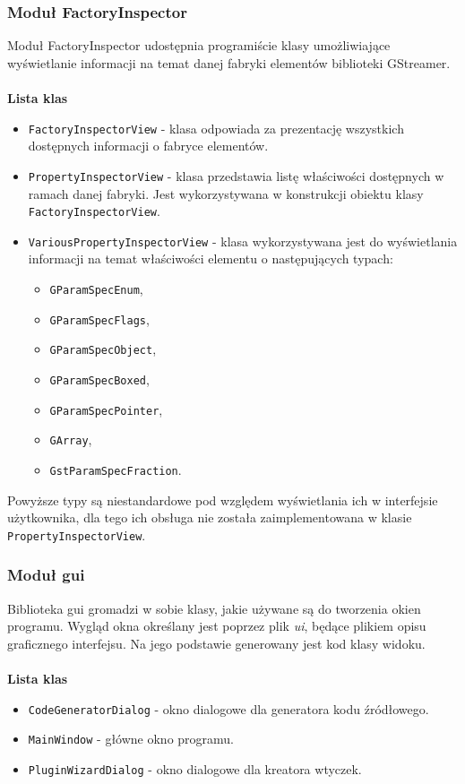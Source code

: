 \documentclass[12pt]{article}
\begin{document}
\subsubsection{Moduł FactoryInspector}
Moduł FactoryInspector udostępnia programiście klasy umożliwiające wyświetlanie informacji na temat danej fabryki elementów biblioteki GStreamer. 
\paragraph{}
\textbf{Lista klas}
\vspace{-2mm}
\begin{itemize}
  \setlength{\itemsep}{0em}
\item \texttt{FactoryInspectorView} - klasa odpowiada za prezentację wszystkich dostępnych informacji o fabryce elementów. 
\item \texttt{PropertyInspectorView} - klasa przedstawia listę właściwości dostępnych w ramach danej fabryki. Jest wykorzystywana w konstrukcji obiektu klasy \texttt{FactoryInspectorView}.
\item \texttt{VariousPropertyInspectorView} - klasa wykorzystywana jest do wyświetlania informacji na temat właściwości elementu o następujących typach:
  \begin{itemize}
    \setlength{\itemsep}{0em}
  \item \texttt{GParamSpecEnum},
  \item \texttt{GParamSpecFlags},
  \item \texttt{GParamSpecObject},
  \item \texttt{GParamSpecBoxed},
  \item \texttt{GParamSpecPointer},
  \item \texttt{GArray},
  \item \texttt{GstParamSpecFraction}.
  \end{itemize}
\end{itemize}
Powyższe typy są niestandardowe pod względem wyświetlania ich w interfejsie użytkownika, dla tego ich obsługa nie została zaimplementowana w klasie \texttt{PropertyInspectorView}.
\subsubsection{Moduł gui}
Biblioteka gui gromadzi w sobie klasy, jakie używane są do tworzenia okien programu. Wygląd okna określany jest poprzez plik \textit{ui}, będące plikiem opisu graficznego interfejsu. Na jego podstawie generowany jest kod klasy widoku. 
\paragraph{}
\textbf{Lista klas}
\vspace{-2mm}
\begin{itemize}
  \setlength{\itemsep}{0em}
\item \texttt{CodeGeneratorDialog} - okno dialogowe dla generatora kodu źródłowego.
\item \texttt{MainWindow} - główne okno programu.
\item \texttt{PluginWizardDialog} - okno dialogowe dla kreatora wtyczek.
\end{itemize}
\end{document}

